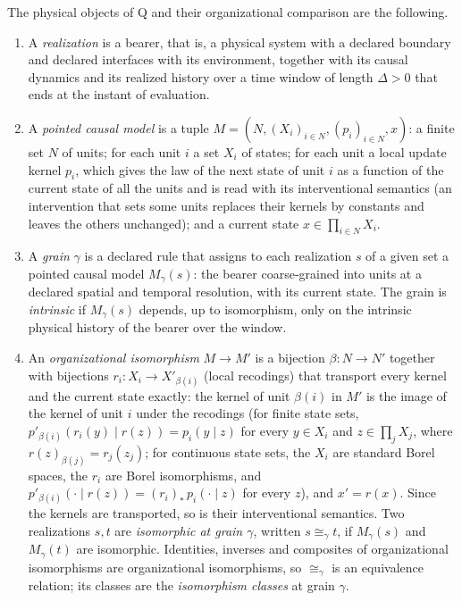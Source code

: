 \begin{definition}\label{def:pcm}
The physical objects of Q and their organizational comparison are the following.
\begin{enumerate}
\item[(a)] A \emph{realization} is a bearer, that is, a physical system with a declared boundary and declared interfaces with its environment, together with its causal dynamics and its realized history over a time window of length $\Delta>0$ that ends at the instant of evaluation.
\item[(b)] A \emph{pointed causal model} is a tuple $M=(N,(X_i)_{i\in N},(p_i)_{i\in N},x)$: a finite set $N$ of units; for each unit $i$ a set $X_i$ of states; for each unit a local update kernel $p_i$, which gives the law of the next state of unit $i$ as a function of the current state of all the units and is read with its interventional semantics (an intervention that sets some units replaces their kernels by constants and leaves the others unchanged); and a current state $x\in\prod_{i\in N}X_i$.
\item[(c)] A \emph{grain} $\gamma$ is a declared rule that assigns to each realization $s$ of a given set a pointed causal model $M_\gamma(s)$: the bearer coarse-grained into units at a declared spatial and temporal resolution, with its current state. The grain is \emph{intrinsic} if $M_\gamma(s)$ depends, up to isomorphism, only on the intrinsic physical history of the bearer over the window.
\item[(d)] An \emph{organizational isomorphism} $M\to M'$ is a bijection $\beta:N\to N'$ together with bijections $r_i:X_i\to X'_{\beta(i)}$ (local recodings) that transport every kernel and the current state exactly: the kernel of unit $\beta(i)$ in $M'$ is the image of the kernel of unit $i$ under the recodings (for finite state sets, $p'_{\beta(i)}(r_i(y)\mid r(z))=p_i(y\mid z)$ for every $y\in X_i$ and $z\in\prod_jX_j$, where $r(z)_{\beta(j)}=r_j(z_j)$; for continuous state sets, the $X_i$ are standard Borel spaces, the $r_i$ are Borel isomorphisms, and $p'_{\beta(i)}(\cdot\mid r(z))=(r_i)_*\,p_i(\cdot\mid z)$ for every $z$), and $x'=r(x)$. Since the kernels are transported, so is their interventional semantics. Two realizations $s,t$ are \emph{isomorphic at grain $\gamma$}, written $s\cong_\gamma t$, if $M_\gamma(s)$ and $M_\gamma(t)$ are isomorphic. Identities, inverses and composites of organizational isomorphisms are organizational isomorphisms, so $\cong_\gamma$ is an equivalence relation; its classes are the \emph{isomorphism classes} at grain $\gamma$.

\end{enumerate}
\end{definition}
